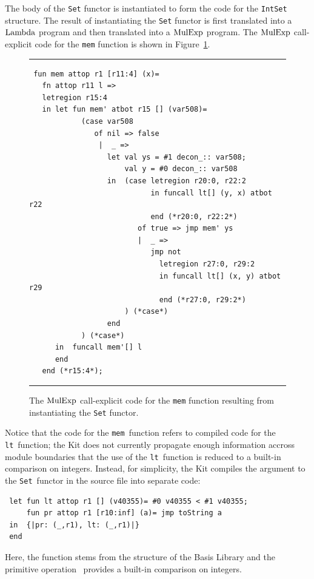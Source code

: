 \documentclass[12pt]{book}
\begin{document}
The body of the {\tt Set} functor is instantiated to form the code for
the {\tt IntSet} structure. The result of instantiating the {\tt Set}
functor is first translated into a $\hbox{\rm Lambda}$ program and then
translated into a $\hbox{\rm MulExp}$ program. The $\hbox{\rm MulExp}$ call-explicit code for the {\tt mem} function is shown in
Figure~\ref{set_inst_mulexp.fig}.
\begin{figure}[ht]
\hrule \medskip
\begin{verbatim}
 fun mem attop r1 [r11:4] (x)= 
   fn attop r11 l => 
   letregion r15:4 
   in let fun mem' atbot r15 [] (var508)= 
            (case var508 
               of nil => false
                |  _ => 
                  let val ys = #1 decon_:: var508; 
                      val y = #0 decon_:: var508
                  in  (case letregion r20:0, r22:2 
                            in funcall lt[] (y, x) atbot r22 
                            end (*r20:0, r22:2*)
                         of true => jmp mem' ys
                         |  _ => 
                            jmp not 
                              letregion r27:0, r29:2 
                              in funcall lt[] (x, y) atbot r29 
                              end (*r27:0, r29:2*)
                      ) (*case*) 
                  end 
            ) (*case*) 
      in  funcall mem'[] l
      end  
   end (*r15:4*); 
\end{verbatim}
\caption{The $\hbox{\rm MulExp}$ call-explicit code for the {\tt mem} function resulting 
from instantiating the {\tt Set} functor.}
\medskip \hrule \label{set_inst_mulexp.fig} 
\end{figure}

Notice that the code for the {\tt mem}~function refers to compiled
code for the {\tt lt}~function; the Kit does not currently
propagate enough information accross module boundaries that the use of
the {\tt lt}~function is reduced to a built-in comparison on
integers. Instead, for simplicity, the Kit compiles the argument to
the {\tt Set}~functor in the source file  into
separate code:
\begin{verbatim}
 let fun lt attop r1 [] (v40355)= #0 v40355 < #1 v40355; 
     fun pr attop r1 [r10:inf] (a)= jmp toString a
 in  {|pr: (_,r1), lt: (_,r1)|}
 end 
\end{verbatim}
Here, the  function stems from the 
structure of the Basis Library and the primitive operation~\boxml{<} provides a built-in comparison
on integers.

\end{document}
